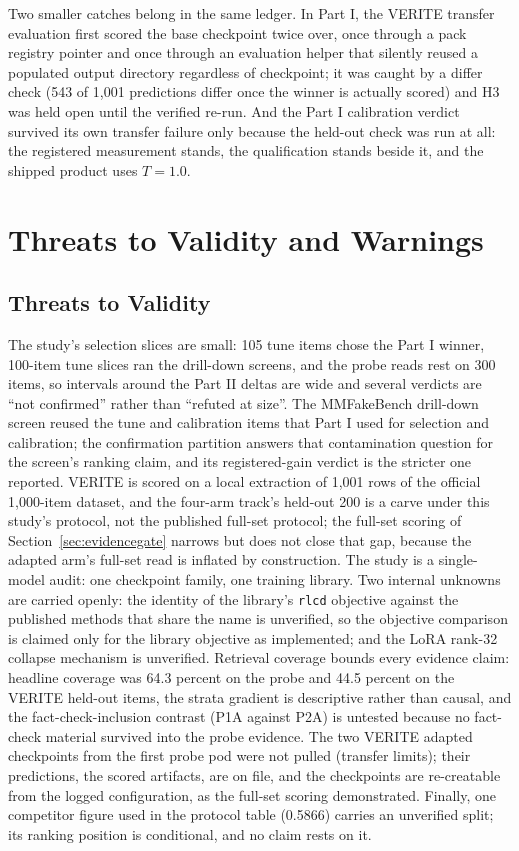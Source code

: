 \documentclass{article} %
\begin{document}
Two smaller catches belong in the same ledger. In Part I, the VERITE transfer evaluation first scored the base checkpoint twice over, once through a pack registry pointer and once through an evaluation helper that silently reused a populated output directory regardless of checkpoint; it was caught by a differ check (543 of 1,001 predictions differ once the winner is actually scored) and H3 was held open until the verified re-run. And the Part I calibration verdict survived its own transfer failure only because the held-out check was run at all: the registered measurement stands, the qualification stands beside it, and the shipped product uses \(T=1.0\).

\section{Threats to Validity and Warnings}
\label{sec:threats}
\subsection{Threats to Validity}
The study's selection slices are small: 105 tune items chose the Part I winner, 100-item tune slices ran the drill-down screens, and the probe reads rest on 300 items, so intervals around the Part II deltas are wide and several verdicts are ``not confirmed'' rather than ``refuted at size''. The MMFakeBench drill-down screen reused the tune and calibration items that Part I used for selection and calibration; the confirmation partition answers that contamination question for the screen's ranking claim, and its registered-gain verdict is the stricter one reported. VERITE is scored on a local extraction of 1,001 rows of the official 1,000-item dataset, and the four-arm track's held-out 200 is a carve under this study's protocol, not the published full-set protocol; the full-set scoring of Section~\ref{sec:evidencegate} narrows but does not close that gap, because the adapted arm's full-set read is inflated by construction. The study is a single-model audit: one checkpoint family, one training library. Two internal unknowns are carried openly: the identity of the library's \texttt{rlcd} objective against the published methods that share the name is unverified, so the objective comparison is claimed only for the library objective as implemented; and the LoRA rank-32 collapse mechanism is unverified. Retrieval coverage bounds every evidence claim: headline coverage was 64.3 percent on the probe and 44.5 percent on the VERITE held-out items, the strata gradient is descriptive rather than causal, and the fact-check-inclusion contrast (P1A against P2A) is untested because no fact-check material survived into the probe evidence. The two VERITE adapted checkpoints from the first probe pod were not pulled (transfer limits); their predictions, the scored artifacts, are on file, and the checkpoints are re-creatable from the logged configuration, as the full-set scoring demonstrated. Finally, one competitor figure used in the protocol table (0.5866) carries an unverified split; its ranking position is conditional, and no claim rests on it.
\end{document}
